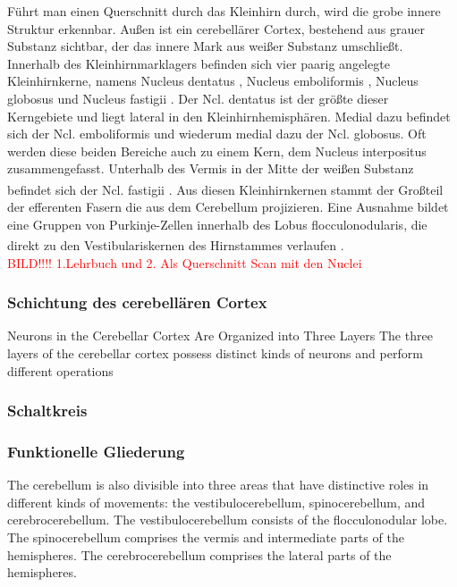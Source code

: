 \documentclass[12pt,a4paper,pdftex]{article}
\begin{document}
Führt man einen Querschnitt durch das Kleinhirn durch, wird die grobe innere Struktur erkennbar. Außen ist ein cerebellärer Cortex, bestehend aus grauer Substanz sichtbar, der das innere Mark aus weißer Substanz umschließt. Innerhalb des Kleinhirnmarklagers befinden sich vier paarig angelegte Kleinhirnkerne, namens Nucleus dentatus , Nucleus emboliformis , Nucleus globosus  und Nucleus fastigii . Der Ncl. dentatus ist der größte dieser Kerngebiete und liegt lateral in den Kleinhirnhemisphären. Medial dazu befindet sich der Ncl. emboliformis und wiederum medial dazu der Ncl. globosus. Oft werden diese beiden Bereiche auch zu einem Kern, dem Nucleus interpositus  zusammengefasst. Unterhalb des Vermis in der Mitte der weißen Substanz befindet sich der Ncl. fastigii \textsuperscript{\cite[7]{trepel2011neuroanatomie}}. Aus diesen Kleinhirnkernen stammt der Großteil der efferenten Fasern die aus dem Cerebellum projizieren. Eine Ausnahme bildet eine Gruppen von Purkinje-Zellen innerhalb des Lobus flocculonodularis, die direkt zu den Vestibulariskernen des Hirnstammes verlaufen \textsuperscript{\cite[42]{kandel2013principles}}. \\        
\textcolor{red}{BILD!!!! 1.Lehrbuch und 2. Als Querschnitt Scan mit den Nuclei}

\subsubsection{Schichtung des cerebellären Cortex}
Neurons in the Cerebellar Cortex Are Organized
into Three Layers
The three layers of the cerebellar cortex possess distinct
kinds of neurons and perform different operations

\subsubsection{Schaltkreis}

\subsubsection{Funktionelle Gliederung}
The cerebellum is also divisible into three areas that have distinctive roles in different kinds of movements: the vestibulocerebellum, spinocerebellum, and cerebrocerebellum. The vestibulocerebellum consists of the flocculonodular lobe. The spinocerebellum comprises the vermis and intermediate parts of the hemispheres. The cerebrocerebellum comprises the lateral parts of the hemispheres.
\end{document}
